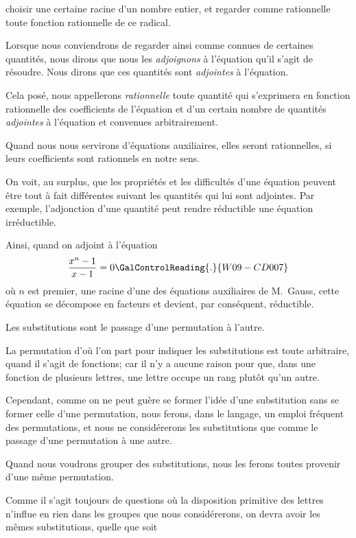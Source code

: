 
choisir une certaine racine d'un nombre entier, et regarder comme
rationnelle toute fonction rationnelle de ce radical.

Lorsque nous conviendrons de regarder ainsi comme connues
de certaines quantités, nous dirons que nous les \emph{adjoignons} à
l'équation qu'il s'agit de résoudre. Nous dirons que ces quantités
sont \emph{adjointes} à l'équation.

Cela posé, nous appellerons \emph{rationnelle} toute quantité qui
s'exprimera en fonction rationnelle des coefficients de l'équation
et d'un certain nombre de quantités \emph{adjointes} à l'équation et
convenues arbitrairement.

Quand nous nous servirons d'équations auxiliaires, elles seront
rationnelles, si leurs coefficients sont rationnels en notre sens.

On voit, au surplus, que les propriétés et les difficultés d'une
équation peuvent être tout à fait différentes suivant les quantités
qui lui sont adjointes. Par exemple, l'adjonction d'une quantité
peut rendre réductible une équation irréductible.

Ainsi, quand on adjoint à l'équation
\[
\frac{x^{n}-1}{x-1}=0\GalControlReading{.}{W09-CD007}
\]
où $n$ est premier, une racine d'une des équations auxiliaires de
M.~Gauss, cette équation se décompose en facteurs et devient, par
conséquent, réductible.

Les substitutions sont le passage d'une permutation à l'autre.

La permutation d'où l'on part pour indiquer les substitutions
est toute arbitraire, quand il s'agit de fonctions; car il n'y a aucune
raison pour que, dans une fonction de plusieurs lettres, une
lettre occupe un rang plutôt qu'un autre.

Cependant, comme on ne peut guère se former l'idée d'une
substitution sans se former celle d'une permutation, nous ferons,
dans le langage, un emploi fréquent des permutations, et nous ne
considérerons les substitutions que comme le passage d'une permutation
à une autre.

Quand nous voudrons grouper des substitutions, nous les ferons
toutes provenir d'une même permutation.

Comme il s'agit toujours de questions où la disposition primitive
des lettres n'influe en rien dans les groupes que nous considérerons,
on devra avoir les mêmes substitutions, quelle que soit
